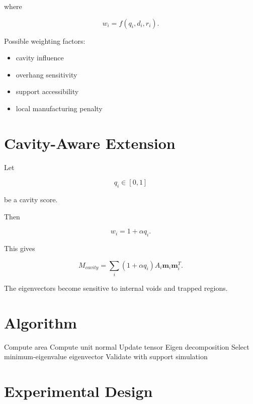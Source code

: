 \documentclass[journal,11pt]{article}
\begin{document}
where

\begin{equation}
w_i
=
f(q_i,d_i,r_i).
\end{equation}

Possible weighting factors:

\begin{itemize}
\item cavity influence
\item overhang sensitivity
\item support accessibility
\item local manufacturing penalty
\end{itemize}

\section{Cavity-Aware Extension}

Let

\begin{equation}
q_i\in[0,1]
\end{equation}

be a cavity score.

Then

\begin{equation}
w_i=1+\alpha q_i.
\end{equation}

This gives

\begin{equation}
M_{cavity}
=
\sum_i
(1+\alpha q_i)
A_i
\mathbf m_i\mathbf m_i^T.
\end{equation}

The eigenvectors become sensitive to internal voids and trapped regions.

\section{Algorithm}

\begin{algorithm}
\caption{Support Tensor Orientation Estimation}
\begin{algorithmic}
\State Compute area
\State Compute unit normal
\State Update tensor
\EndFor
\State Eigen decomposition
\State Select minimum-eigenvalue eigenvector
\State Validate with support simulation
\end{algorithmic}
\end{algorithm}

\section{Experimental Design}
\end{document}
